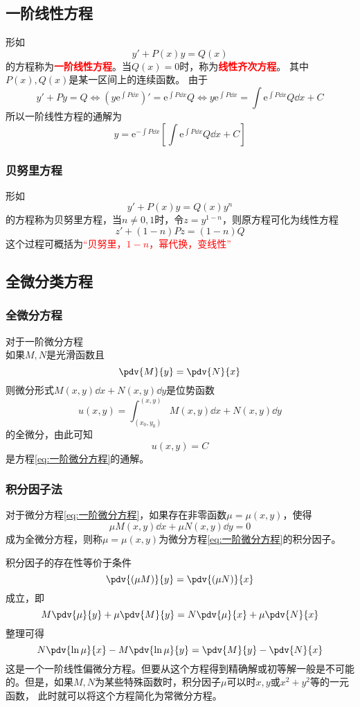 \subsection{一阶线性方程}
形如\[ y' + P(x)y = Q(x) \]的方程称为\textcolor{red}{\textbf{\textsf{一阶线性方程}}}。当$Q(x)=0$时，称为\textcolor{red}{\textbf{\textsf{线性齐次方程}}}。
其中$P(x),Q(x)$是某一区间上的连续函数。
由于
\[ y' + Py = Q \iff (y\mathrm{e}^{\int P\dd{x}})' = \mathrm{e}^{\int P\dd{x}}Q \iff y\mathrm{e}^{\int P\dd{x}} = \int \mathrm{e}^{\int P\dd{x}}Q\dd{x} + C \]
所以一阶线性方程的通解为
\[ y = \mathrm{e}^{-\int P\dd{x}}\left[\int \mathrm{e}^{\int P\dd{x}}Q \dd{x} +C \right] \]
\subsubsection{贝努里方程}
形如
\[ y' + P(x)y = Q(x)y^n \]
的方程称为贝努里方程，当$n\neq 0,1$时，令$z=y^{1-n}$，则原方程可化为线性方程
\[ z' + (1-n)Pz = (1-n)Q \]
这个过程可概括为\textcolor{red}{“贝努里，$1-n$，幂代换，变线性”}

\subsection{全微分类方程}
\subsubsection{全微分方程}
对于一阶微分方程
\begin{equation}
    \label{eq:一阶微分方程}
\end{equation}
如果$M,N$是光滑函数且
\[ \pdv{M}{y} = \pdv{N}{x} \]
则微分形式$M(x,y)\dd{x} + N(x,y)\dd{y}$是位势函数
\[ u(x,y) = \int_{(x_0,y_0)}^{(x,y)} M(x,y)\dd{x} + N(x,y)\dd{y} \]
的全微分，由此可知
\[ u(x,y) = C \]
是方程\ref{eq:一阶微分方程}的通解。

\subsubsection{积分因子法}
对于微分方程\ref{eq:一阶微分方程}，如果存在非零函数$\mu=\mu(x,y)$，使得
\[ \mu M(x,y)\dd{x} + \mu N(x,y)\dd{y} = 0 \]
成为全微分方程，则称$\mu=\mu(x,y)$为微分方程\ref{eq:一阶微分方程}的积分因子。

积分因子的存在性等价于条件
\[ \pdv{(\mu M)}{y} = \pdv{(\mu N)}{x} \]
成立，即
\[ M\pdv{\mu}{y} + \mu\pdv{M}{y} = N\pdv{\mu}{x} + \mu\pdv{N}{x} \]
整理可得
\begin{equation}
    \label{eq:积分因子法}
    N\pdv{\ln\mu}{x} - M\pdv{\ln\mu}{y} = \pdv{M}{y} - \pdv{N}{x}
\end{equation}
这是一个一阶线性偏微分方程。但要从这个方程得到精确解或初等解一般是不可能的。但是，如果$M,N$为某些特殊函数时，积分因子$\mu$可以时$x,y$或$x^2+y^2$等的一元函数，
此时就可以将这个方程简化为常微分方程。


